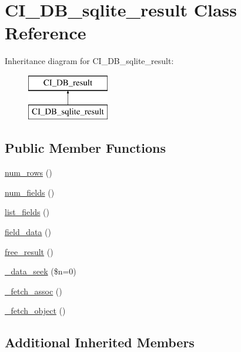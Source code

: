 \hypertarget{class_c_i___d_b__sqlite__result}{\section{C\-I\-\_\-\-D\-B\-\_\-sqlite\-\_\-result Class Reference}
\label{class_c_i___d_b__sqlite__result}
}
Inheritance diagram for C\-I\-\_\-\-D\-B\-\_\-sqlite\-\_\-result\-:\begin{figure}[H]
\begin{center}
\leavevmode
\includegraphics[height=2.000000cm]{class_c_i___d_b__sqlite__result}
\end{center}
\end{figure}
\subsection*{Public Member Functions}
\begin{DoxyCompactItemize}
\item 
\hyperlink{class_c_i___d_b__sqlite__result_a218657c303ee499b97710ab0cd2f5d6e}{num\-\_\-rows} ()
\item 
\hyperlink{class_c_i___d_b__sqlite__result_af831bf363e4d7d661a717a4932af449d}{num\-\_\-fields} ()
\item 
\hyperlink{class_c_i___d_b__sqlite__result_a50b54eb4ea7cfd039740f532988ea776}{list\-\_\-fields} ()
\item 
\hyperlink{class_c_i___d_b__sqlite__result_a84bffd65e53902ade1591716749a33e3}{field\-\_\-data} ()
\item 
\hyperlink{class_c_i___d_b__sqlite__result_aad2d98d6beb3d6095405356c6107b473}{free\-\_\-result} ()
\item 
\hyperlink{class_c_i___d_b__sqlite__result_aeba9dd69307793342d1c81ccb3e55ff9}{\-\_\-data\-\_\-seek} (\$n=0)
\item 
\hyperlink{class_c_i___d_b__sqlite__result_a43a9a92817f1334a1c10752ec44275a0}{\-\_\-fetch\-\_\-assoc} ()
\item 
\hyperlink{class_c_i___d_b__sqlite__result_a236bae79bb43606aa86598719b281c1f}{\-\_\-fetch\-\_\-object} ()
\end{DoxyCompactItemize}
\subsection*{Additional Inherited Members}


